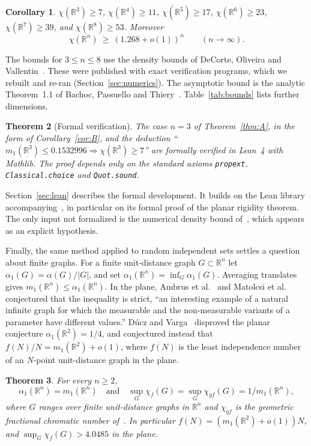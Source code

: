 \documentclass[11pt]{amsart}
\newtheorem{theorem}{Theorem}[section]
\newtheorem{corollary}[theorem]{Corollary}
\theoremstyle{definition}
\newcommand{\R}{\mathbb{R}}
\begin{document}
\begin{corollary}\label{cor:C}
$\chi(\R^3)\ge7$, $\chi(\R^4)\ge11$, $\chi(\R^5)\ge17$, $\chi(\R^6)\ge23$, $\chi(\R^7)\ge39$, and $\chi(\R^8)\ge53$. Moreover
\[
\chi(\R^n)\ \ge\ (1.268+o(1))^n\qquad(n\to\infty).
\]
\end{corollary}

The bounds for $3\le n\le8$ use the density bounds of DeCorte, Oliveira and Vallentin~\cite{DOV}. These were published with exact verification programs, which we rebuilt and re-ran (Section~\ref{sec:numerics}). The asymptotic bound is the analytic Theorem~1.1 of Bachoc, Passuello and Thiery~\cite{BPT}. Table~\ref{tab:bounds} lists further dimensions.

\begin{theorem}[Formal verification]\label{thm:lean}
The case $n=3$ of Theorem~\ref{thm:A}, in the form of Corollary~\ref{cor:B}, and the deduction ``$m_1(\R^3)\le0.1532996\Rightarrow\chi(\R^3)\ge7$'' are formally verified in Lean~4 with Mathlib. The proof depends only on the standard axioms \texttt{propext}, \texttt{Classical.choice} and \texttt{Quot.sound}.
\end{theorem}

Section~\ref{sec:lean} describes the formal development. It builds on the Lean library accompanying~\cite{OAI}, in particular on its formal proof of the planar rigidity theorem. The only input not formalized is the numerical density bound of~\cite{DOV}, which appears as an explicit hypothesis.

Finally, the same method applied to random independent sets settles a question about finite graphs. For a finite unit-distance graph $G\subset\R^n$ let $\alpha_1(G)=\alpha(G)/|G|$, and set $\alpha_1(\R^n)=\inf_G\alpha_1(G)$. Averaging translates gives $m_1(\R^n)\le\alpha_1(\R^n)$. In the plane, Ambrus et al.~\cite{ACMVZ} and Matolcsi et al.~\cite{MRVZ} conjectured that the inequality is strict, ``an interesting example of a natural infinite graph for which the measurable and the non-measurable variants of a parameter have different values.'' D\'ucz and Varga~\cite{DV} disproved the planar conjecture $\alpha_1(\R^2)=1/4$, and conjectured instead that $f(N)/N=m_1(\R^2)+o(1)$, where $f(N)$ is the least independence number of an $N$-point unit-distance graph in the plane.

\begin{theorem}\label{thm:D}
For every $n\ge2$,
\[
\alpha_1(\R^n)=m_1(\R^n)\quad\text{and}\quad\sup_{G}\chi_f(G)=\sup_G\chi_{gf}(G)=1/m_1(\R^n),
\]
where $G$ ranges over finite unit-distance graphs in $\R^n$ and $\chi_{gf}$ is the geometric fractional chromatic number of~\cite{ACMVZ,MRVZ}. In particular $f(N)=(m_1(\R^2)+o(1))N$, and $\sup_G\chi_f(G)>4.0485$ in the plane.
\end{theorem}
\end{document}
